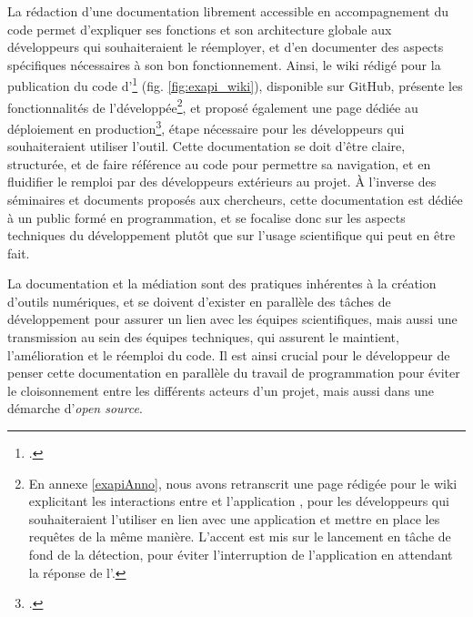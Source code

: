     La rédaction d'une documentation librement accessible en accompagnement du code permet d'expliquer ses fonctions et son architecture globale aux développeurs qui souhaiteraient le réemployer, et d'en documenter des aspects spécifiques nécessaires à son bon fonctionnement. Ainsi, le wiki rédigé pour la publication du code d'\exapi\footcite{Homea} (fig. \ref{fig:exapi_wiki}), disponible sur GitHub, présente les fonctionnalités de l'\api développée\footnote{En annexe \ref{exapiAnno}, nous avons retranscrit une page rédigée pour le wiki explicitant les interactions entre \exapi et l'application \eida, pour les développeurs qui souhaiteraient l'utiliser en lien avec une application et mettre en place les requêtes de la même manière. L'accent est mis sur le lancement en tâche de fond de la détection, pour éviter l'interruption de l'application en attendant la réponse de l'\api.}, et proposé également une page dédiée au déploiement en production\footcite{DeploymentProduction}, étape nécessaire pour les développeurs qui souhaiteraient utiliser l'outil. Cette documentation se doit d'être claire, structurée, et de faire référence au code pour permettre sa navigation, et en fluidifier le remploi par des développeurs extérieurs au projet. À l'inverse des séminaires et documents proposés aux chercheurs, cette documentation est dédiée à un public formé en programmation, et se focalise donc sur les aspects techniques du développement plutôt que sur l'usage scientifique qui peut en être fait.
    
	La documentation et la médiation sont des pratiques inhérentes à la création d'outils numériques, et se doivent d'exister en parallèle des tâches de développement pour assurer un lien avec les équipes scientifiques, mais aussi une transmission au sein des équipes techniques, qui assurent le maintient, l'amélioration et le réemploi du code. Il est ainsi crucial pour le développeur de penser cette documentation en parallèle du travail de programmation pour éviter le cloisonnement entre les différents acteurs d'un projet, mais aussi dans une démarche d'\textit{open source}.
